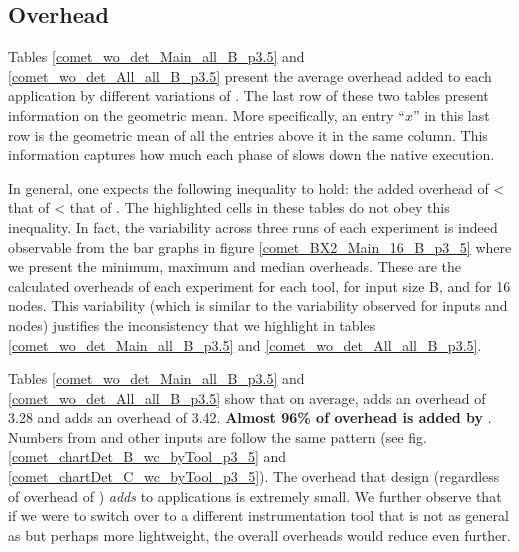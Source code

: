   
\subsection{ \pininit Overhead} 
\label{subsec:pinit}
Tables \ref{comet_wo_det_Main_all_B_p3.5} and
\ref{comet_wo_det_All_all_B_p3.5} present the average overhead added to each
application by different variations of \parlot. 
%
The last row of these two tables
present information on the geometric mean.
%
More specifically, an entry ``$x$'' in this last row
is the geometric mean of all
the entries above it in the same column.
%
This information captures how much each
phase of \parlot slows down the native execution. 


In general, one 
expects the following inequality to hold:
 the added overhead of \pininit < that of \parlot
< that of \parlotnc. 
%
The highlighted cells in these tables do not
obey this inequality.
%
In fact, the variability across three runs of each experiment
is indeed observable from the bar graphs in figure \ref{comet_BX2_Main_16_B_p3_5}
where we present the minimum, maximum and median overheads.
%
These are the calculated
overheads of each experiment for each tool, for input size B, and for 16
nodes. 
%
This variability (which is similar to the variability observed for inputs and nodes)
justifies the inconsistency that we highlight in  tables
\ref{comet_wo_det_Main_all_B_p3.5} and
\ref{comet_wo_det_All_all_B_p3.5}.


Tables \ref{comet_wo_det_Main_all_B_p3.5} and
\ref{comet_wo_det_All_all_B_p3.5} show that on average, \pininit adds
an overhead of 3.28  and \parlota adds an overhead of 3.42. 
%
\textbf{Almost 96\%
of \parlota overhead is added by \pininit}. 
%
Numbers from \parlotm and
other inputs are follow the same pattern
(see fig. \ref{comet_chartDet_B_wc_byTool_p3_5} and \ref{comet_chartDet_C_wc_byTool_p3_5}). 
%
The overhead that \parlot design (regardless of overhead of \pininit) {\em adds}
to applications is extremely small.
%
We further observe that if we were to switch over to a different
instrumentation tool that is not as general as \pin but perhaps more
lightweight, the overall overheads would reduce even further. \\






